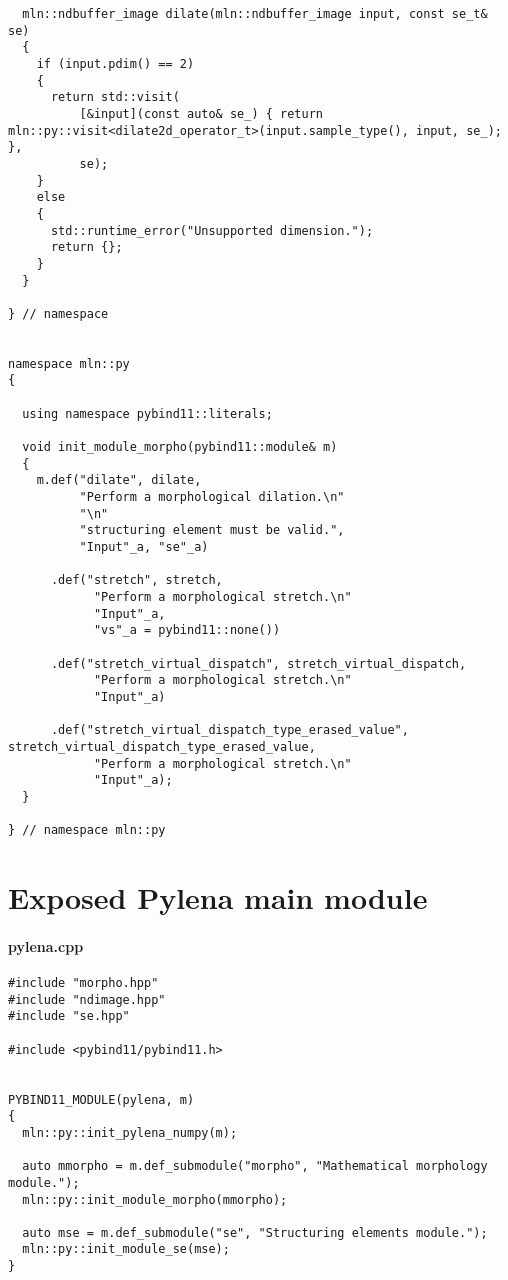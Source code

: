 \begin{verbatim}
  mln::ndbuffer_image dilate(mln::ndbuffer_image input, const se_t& se)
  {
    if (input.pdim() == 2)
    {
      return std::visit(
          [&input](const auto& se_) { return mln::py::visit<dilate2d_operator_t>(input.sample_type(), input, se_); },
          se);
    }
    else
    {
      std::runtime_error("Unsupported dimension.");
      return {};
    }
  }

} // namespace


namespace mln::py
{

  using namespace pybind11::literals;

  void init_module_morpho(pybind11::module& m)
  {
    m.def("dilate", dilate,
          "Perform a morphological dilation.\n"
          "\n"
          "structuring element must be valid.",
          "Input"_a, "se"_a)

      .def("stretch", stretch,
            "Perform a morphological stretch.\n"
            "Input"_a,
            "vs"_a = pybind11::none())

      .def("stretch_virtual_dispatch", stretch_virtual_dispatch,
            "Perform a morphological stretch.\n"
            "Input"_a)

      .def("stretch_virtual_dispatch_type_erased_value", stretch_virtual_dispatch_type_erased_value,
            "Perform a morphological stretch.\n"
            "Input"_a);
  }

} // namespace mln::py
\end{verbatim}


\clearpage

\section{Exposed Pylena main module}
\label{appendix:static-dynamic-bridge.pylena}

\paragraph{pylena.cpp}
\label{appendix:static-dynamic-bridge.pylena.cpp}

\begin{verbatim}
#include "morpho.hpp"
#include "ndimage.hpp"
#include "se.hpp"

#include <pybind11/pybind11.h>


PYBIND11_MODULE(pylena, m)
{
  mln::py::init_pylena_numpy(m);

  auto mmorpho = m.def_submodule("morpho", "Mathematical morphology module.");
  mln::py::init_module_morpho(mmorpho);

  auto mse = m.def_submodule("se", "Structuring elements module.");
  mln::py::init_module_se(mse);
}
\end{verbatim}


